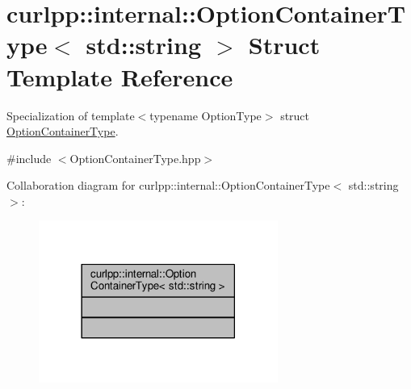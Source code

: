 \hypertarget{structcurlpp_1_1internal_1_1OptionContainerType_3_01std_1_1string_01_4}{\section{curlpp\-:\-:internal\-:\-:Option\-Container\-Type$<$ std\-:\-:string $>$ Struct Template Reference}
\label{structcurlpp_1_1internal_1_1OptionContainerType_3_01std_1_1string_01_4}
}


Specialization of template$<$typename Option\-Type$>$ struct \hyperlink{structcurlpp_1_1internal_1_1OptionContainerType}{Option\-Container\-Type}.  




{\ttfamily \#include $<$Option\-Container\-Type.\-hpp$>$}



Collaboration diagram for curlpp\-:\-:internal\-:\-:Option\-Container\-Type$<$ std\-:\-:string $>$\-:
\nopagebreak
\begin{figure}[H]
\begin{center}
\leavevmode
\includegraphics[width=222pt]{structcurlpp_1_1internal_1_1OptionContainerType_3_01std_1_1string_01_4__coll__graph}
\end{center}
\end{figure}

